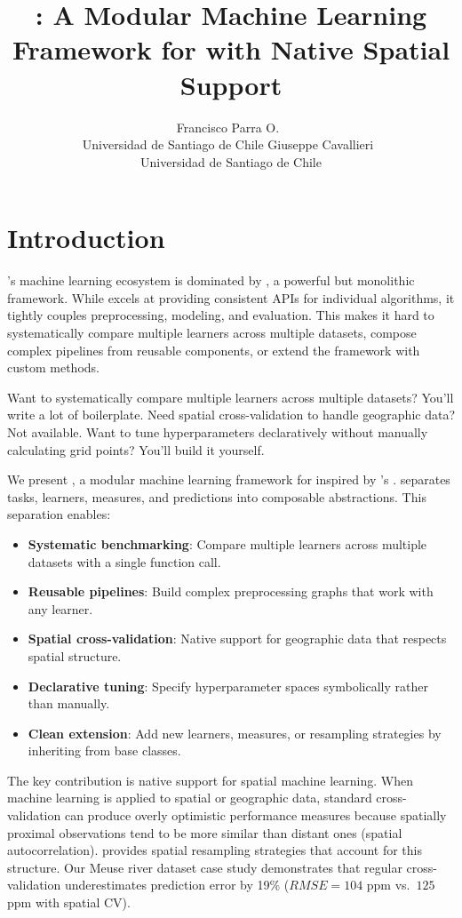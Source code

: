 \documentclass[article]{jss}
\author{Francisco Parra O.~\orcidlink{0009-0006-0435-1854}\\Universidad de Santiago de Chile
   \And Giuseppe Cavallieri~\orcidlink{0009-0002-9854-1456}\\Universidad de Santiago de Chile}
\title{\pkg{MLPY}: A Modular Machine Learning Framework for \proglang{Python} with Native Spatial Support}
\begin{document}

\section[Introduction]{Introduction} \label{sec:intro}

's machine learning ecosystem is dominated by  \citep{pedregosa2011scikit}, a powerful but monolithic framework. While  excels at providing consistent APIs for individual algorithms, it tightly couples preprocessing, modeling, and evaluation. This makes it hard to systematically compare multiple learners across multiple datasets, compose complex pipelines from reusable components, or extend the framework with custom methods.

Want to systematically compare multiple learners across multiple datasets? You'll write a lot of boilerplate. Need spatial cross-validation to handle geographic data? Not available. Want to tune hyperparameters declaratively without manually calculating grid points? You'll build it yourself.

We present , a modular machine learning framework for  inspired by 's  \citep{lang2019mlr3}.  separates tasks, learners, measures, and predictions into composable abstractions. This separation enables:

\begin{itemize}
\item \textbf{Systematic benchmarking}: Compare multiple learners across multiple datasets with a single function call.
\item \textbf{Reusable pipelines}: Build complex preprocessing graphs that work with any learner.
\item \textbf{Spatial cross-validation}: Native support for geographic data that respects spatial structure.
\item \textbf{Declarative tuning}: Specify hyperparameter spaces symbolically rather than manually.
\item \textbf{Clean extension}: Add new learners, measures, or resampling strategies by inheriting from base classes.
\end{itemize}

The key contribution is native support for spatial machine learning. When machine learning is applied to spatial or geographic data, standard cross-validation can produce overly optimistic performance measures because spatially proximal observations tend to be more similar than distant ones (spatial autocorrelation).  provides spatial resampling strategies that account for this structure. Our Meuse river dataset case study demonstrates that regular cross-validation underestimates prediction error by 19\% ($RMSE = 104$ ppm vs.~$125$ ppm with spatial CV).
\end{document}
